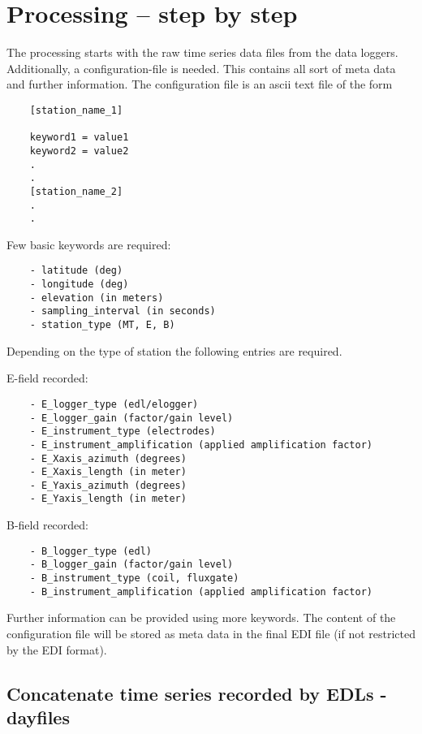 
\section{Processing -- step by step}
\label{sec:processing.steps}

The processing starts with the raw time series data files from the data loggers. 
Additionally, a configuration-file is needed. This contains all sort of meta data and further information.
The configuration file is an ascii text file of the form\\
\begin{verbatim}
    [station_name_1]
    
    keyword1 = value1
    keyword2 = value2
    .
    .
    [station_name_2]
    .
    .
\end{verbatim}
Few basic keywords are required:
\begin{verbatim}
    - latitude (deg)
    - longitude (deg)
    - elevation (in meters)
    - sampling_interval (in seconds)
    - station_type (MT, E, B)
\end{verbatim}

    Depending on the type of station the following entries are required.

    E-field recorded:
\begin{verbatim}
    - E_logger_type (edl/elogger)
    - E_logger_gain (factor/gain level)
    - E_instrument_type (electrodes)
    - E_instrument_amplification (applied amplification factor)
    - E_Xaxis_azimuth (degrees)
    - E_Xaxis_length (in meter)
    - E_Yaxis_azimuth (degrees)
    - E_Yaxis_length (in meter)
\end{verbatim}

    B-field recorded:
\begin{verbatim}
    - B_logger_type (edl)
    - B_logger_gain (factor/gain level)
    - B_instrument_type (coil, fluxgate)
    - B_instrument_amplification (applied amplification factor)

\end{verbatim}

Further information can be provided using more keywords. The content of the configuration file will be stored as meta data in the final EDI file (if not restricted by the EDI format).


\subsection{Concatenate time series recorded by EDLs - dayfiles}


